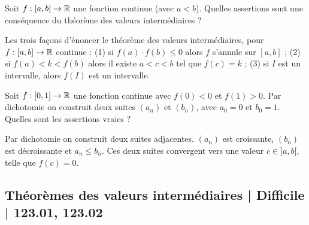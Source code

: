 \begin{question}
Soit $f : [a,b] \to \mathbb{R}$ une fonction continue (avec $a < b$). Quelles assertions sont une conséquence du théorème des valeurs intermédiaires ?
\begin{answers}



    \bad{Si $c \in ]a,b[$ alors $f(c) \in ]f(a),f(b)[$.}
\end{answers}
\begin{explanations}
Les trois façons d'énoncer le théorème des valeurs intermédiaires, pour $f : [a,b] \to \mathbb{R}$ continue :
(1) si $f(a) \cdot f(b) \le 0$ alors $f$ s'annule sur $[a,b]$ ;
(2) si $f(a) < k < f(b)$ alors il existe $a < c < b$ tel que $f(c)=k$ ;
(3) si $I$ est un intervalle, alors $f(I)$ est un intervalle.
\end{explanations}
\end{question}


\begin{question}
Soit $f : [0,1] \to \mathbb{R}$ une fonction continue avec $f(0)<0$ et $f(1)>0$.
Par dichotomie on construit deux suites $(a_n)$ et $(b_n)$, avec $a_0 = 0$ et $b_0 = 1$. Quelles sont les assertions vraies ?
\begin{answers}



\end{answers}
\begin{explanations}
Par dichotomie on construit deux suites adjacentes. $(a_n)$ est croissante, $(b_n)$ est décroissante et $a_n \le b_n$. Ces deux suites convergent vers une valeur $c\in]a,b[$, telle que $f(c)=0$.
\end{explanations}
\end{question}



\subsection{Théorèmes des valeurs intermédiaires | Difficile | 123.01, 123.02}


